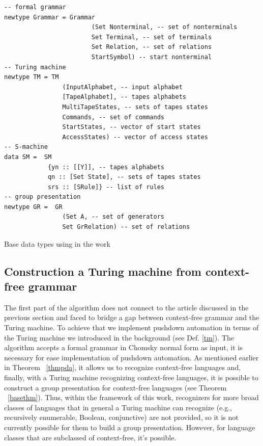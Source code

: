 \documentclass[conference]{IEEEtran}
\theoremstyle{definition}
\begin{document}
\begin{listing*}[hbp]
\centering
\begin{verbatim}
-- formal grammar
newtype Grammar = Grammar 
                        (Set Nonterminal, -- set of nonterminals
                        Set Terminal, -- set of terminals
                        Set Relation, -- set of relations
                        StartSymbol) -- start nonterminal
-- Turing machine                        
newtype TM = TM 
                (InputAlphabet, -- input alphabet 
                [TapeAlphabet], -- tapes alphabets
                MultiTapeStates, -- sets of tapes states
                Commands, -- set of commands
                StartStates, -- vector of start states
                AccessStates) -- vector of access states
-- S-machine                
data SM =  SM 
            {yn :: [[Y]], -- tapes alphabets
            qn :: [Set State], -- sets of tapes states
            srs :: [SRule]} -- list of rules
-- group presentation        
newtype GR =  GR 
                (Set A, -- set of generators
                Set GrRelation) -- set of relations
\end{verbatim}
\caption{Base data types using in the work}
\label{list:types}
\end{listing*}

\subsection{Construction a Turing machine from context-free grammar}

The first part of the algorithm does not connect to the article discussed in the previous section and faced to bridge a gap between context-free grammar and the Turing machine.
To achieve that we implement pushdown automation in terms of the Turing machine we introduced
in the background (see Def. \ref{tm}). The algorithm accepts a formal grammar in Chomsky normal form as input,
it is necessary for ease implementation of pushdown automation.
As mentioned earlier in Theorem ~\ref{thmpda}, it allows us to recognize context-free languages and, finally, with a Turing machine recognizing context-free languages, it is possible to construct a group presentation for context-free languages
(see Theorem ~\ref{basethm}). Thus, within the framework of this work, recognizers for more broad classes of languages that in general a Turing machine can recognize
(e.g., recursively enumerable, Boolean, conjunctive) are not provided, so it is not currently possible for them to build a group presentation. However, for language classes that are subclassed of context-free, it's possible.
\end{document}
